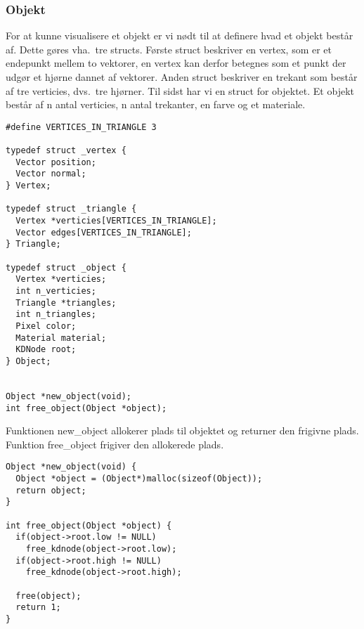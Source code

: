 \subsubsection{Objekt}
For at kunne visualisere et objekt er vi nødt til at definere hvad et objekt består af. Dette gøres vha.\ tre structs. Første struct beskriver en vertex, som er et endepunkt mellem to vektorer, en vertex kan derfor betegnes som et punkt der udgør et hjørne dannet af vektorer. Anden struct beskriver en trekant som består af tre verticies, dvs.\ tre hjørner. Til sidst har vi en struct for objektet. Et objekt består af n antal verticies, n antal trekanter, en farve og et materiale. 

\begin{lstlisting}[style=Cstyle, caption=Objekter]
#define VERTICES_IN_TRIANGLE 3

typedef struct _vertex {
  Vector position;
  Vector normal;
} Vertex;

typedef struct _triangle {
  Vertex *verticies[VERTICES_IN_TRIANGLE];
  Vector edges[VERTICES_IN_TRIANGLE];
} Triangle;

typedef struct _object {
  Vertex *verticies;
  int n_verticies;
  Triangle *triangles;
  int n_triangles;
  Pixel color;
  Material material;
  KDNode root;
} Object;


Object *new_object(void);
int free_object(Object *object);
\end{lstlisting}

Funktionen new\_object allokerer plads til objektet og returner den frigivne plads. Funktion free\_object frigiver den allokerede plads. 
\begin{lstlisting}[style=Cstyle, caption=Funktionerne]
Object *new_object(void) {
  Object *object = (Object*)malloc(sizeof(Object));
  return object;
}

int free_object(Object *object) {
  if(object->root.low != NULL)
    free_kdnode(object->root.low);
  if(object->root.high != NULL)
    free_kdnode(object->root.high);

  free(object);
  return 1;
}
\end{lstlisting}



